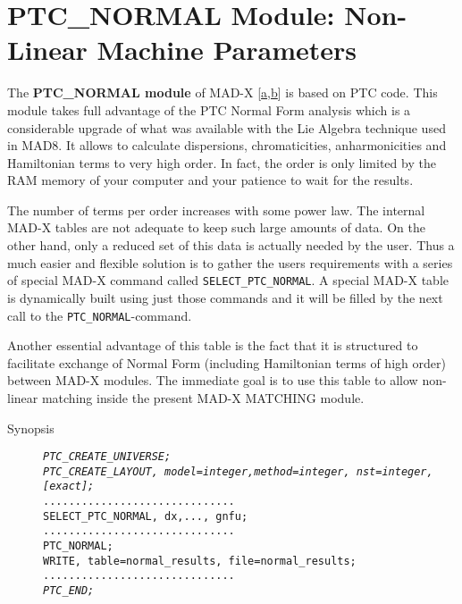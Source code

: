 

\section{PTC\_NORMAL Module: Non-Linear Machine Parameters}

The \textbf{PTC\_NORMAL module} of MAD-X
[\hyperlink{F._Schmidt}{a},\hyperlink{d Amico}{b}] is based on PTC
code. This module takes full advantage of the PTC Normal Form analysis
which is  a  considerable upgrade of what was available with
the Lie Algebra   technique used in MAD8. It allows to calculate
dispersions, chromaticities,   anharmonicities and Hamiltonian terms to
very high order. In fact, the order is   only limited by the RAM memory
of your computer and your patience to wait for   the results.  

The number of terms per order increases with some power law. The
internal MAD-X   tables are not adequate to keep such large amounts of
data. On the other hand,   only a reduced set of this data is actually
needed by the user. Thus a much   easier and flexible solution is to
gather the users  requirements with a series   of special MAD-X command
called \texttt{SELECT\_PTC\_NORMAL}. A   special MAD-X table is
dynamically built using just those commands and it will   be filled by
the next call to the \texttt{PTC\_NORMAL}-command.  

Another essential advantage of this table is the fact that it is
structured to   facilitate exchange of Normal Form (including
Hamiltonian terms of high order)   between MAD-X modules. The immediate
goal is to use this table to allow   non-linear matching inside the
present MAD-X MATCHING module. 


\begin{description}
   \item[Synopsis]
     \text{ \\}
     \textit{
       \texttt{PTC\_CREATE\_UNIVERSE;}}\\
     \textit{\texttt{PTC\_CREATE\_LAYOUT, model=integer,method=integer,  nst=integer, [exact];}}\\
     \texttt{..............................\\
       SELECT\_PTC\_NORMAL, dx,..., gnfu;}\\
     \texttt{..............................}\\
     \texttt{PTC\_NORMAL;\\
       WRITE, table=normal\_results, file=normal\_results;}\\
     \texttt{..............................}\\
     \textit{\texttt{PTC\_END; }}\\
\end{description}

